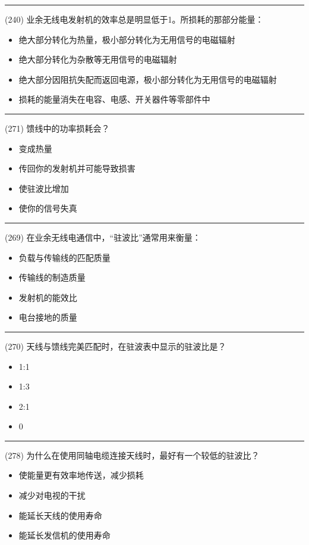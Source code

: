 \documentclass[twocolumn,hyperref,UTF8]{ctexart}  %
\begin{document}
\noindent\rule{0.5\textwidth}{1pt}
\heiti (240) 业余无线电发射机的效率总是明显低于1。所损耗的那部分能量： \songti {\color{gray} [LK0814] }
\begin{itemize}
	\item  绝大部分转化为热量，极小部分转化为无用信号的电磁辐射
	\item  绝大部分转化为杂散等无用信号的电磁辐射
	\item  绝大部分因阻抗失配而返回电源，极小部分转化为无用信号的电磁辐射
	\item  损耗的能量消失在电容、电感、开关器件等零部件中
\end{itemize}


\noindent\rule{0.5\textwidth}{1pt}
\heiti (271) 馈线中的功率损耗会？ \songti {\color{gray} [LK1188] }
\begin{itemize}
	\item  变成热量
	\item  传回你的发射机并可能导致损害
	\item  使驻波比增加
	\item  使你的信号失真
\end{itemize}


\noindent\rule{0.5\textwidth}{1pt}
\heiti (269) 在业余无线电通信中，“驻波比”通常用来衡量： \songti {\color{gray} [LK1185] }
\begin{itemize}
	\item  负载与传输线的匹配质量
	\item  传输线的制造质量
	\item  发射机的能效比
	\item  电台接地的质量
\end{itemize}


\noindent\rule{0.5\textwidth}{1pt}
\heiti (270) 天线与馈线完美匹配时，在驻波表中显示的驻波比是？ \songti {\color{gray} [LK1186] }
\begin{itemize}
	\item  1:1
	\item  1:3
	\item  2:1
	\item  0
\end{itemize}


\noindent\rule{0.5\textwidth}{1pt}
\heiti (278) 为什么在使用同轴电缆连接天线时，最好有一个较低的驻波比？ \songti {\color{gray} [LK1217] }
\begin{itemize}
	\item  使能量更有效率地传送，减少损耗
	\item  减少对电视的干扰
	\item  能延长天线的使用寿命
	\item  能延长发信机的使用寿命
\end{itemize}
\end{document}
